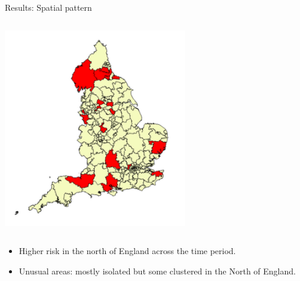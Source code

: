 \documentclass[slidestop,compress,serif,10pt]{beamer}
\begin{document}
\begin{frame}{Results: Spatial pattern}
\begin{columns}
\begin{column}{0.5\textwidth}               
                 \includegraphics[width=0.6\textwidth]{outbreaks_map}
\end{column}
\end{columns}
\begin{itemize}
\vfill\item Higher risk in the north of England across the time period.
\vfill\item Unusual areas: mostly isolated but some clustered in the North of England.
\end{itemize}

\end{frame}
\end{document}
